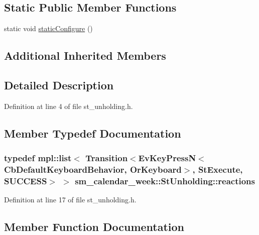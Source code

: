 \subsection*{Static Public Member Functions}
\begin{DoxyCompactItemize}
\item 
static void \hyperlink{structsm__calendar__week_1_1StUnholding_aeec686f4086f9a9e9892a8f76295b3ec}{static\+Configure} ()
\end{DoxyCompactItemize}
\subsection*{Additional Inherited Members}


\subsection{Detailed Description}


Definition at line 4 of file st\+\_\+unholding.\+h.



\subsection{Member Typedef Documentation}
\subsubsection[{\texorpdfstring{reactions}{reactions}}]{\setlength{\rightskip}{0pt plus 5cm}typedef mpl\+::list$<$ Transition$<$Ev\+Key\+PressN$<$Cb\+Default\+Keyboard\+Behavior, {\bf Or\+Keyboard}$>$, {\bf St\+Execute}, {\bf S\+U\+C\+C\+E\+SS}$>$ $>$ {\bf sm\+\_\+calendar\+\_\+week\+::\+St\+Unholding\+::reactions}}\hypertarget{structsm__calendar__week_1_1StUnholding_a00908bd0fd131a9bf763bdf90cc651d9}{}\label{structsm__calendar__week_1_1StUnholding_a00908bd0fd131a9bf763bdf90cc651d9}


Definition at line 17 of file st\+\_\+unholding.\+h.



\subsection{Member Function Documentation}

